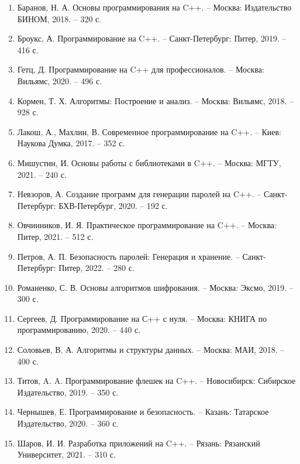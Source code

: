 \documentclass[14pt,a4paper]{scrartcl}
\begin{document}
\begin{enumerate}
\item Баранов, Н. А. Основы программирования на C++. – Москва: Издательство БИНОМ, 2018. – 320 с.
\item Броукс, А. Программирование на C++. – Санкт-Петербург: Питер, 2019. – 416 с.
\item Гетц, Д. Программирование на C++ для профессионалов. – Москва: Вильямс, 2020. – 496 с.
\item Кормен, Т. Х. Алгоритмы: Построение и анализ. – Москва: Вильямс, 2018. – 928 с.
\item Лакош, А., Махлин, В. Современное программирование на C++. – Киев: Наукова Думка, 2017. – 352 с.
\item Мишустин, И. Основы работы с библиотеками в C++. – Москва: МГТУ, 2021. – 240 с.
\item Невзоров, А. Создание программ для генерации паролей на C++. – Санкт-Петербург: БХВ-Петербург, 2020. – 192 с.
\item Овчинников, И. Я. Практическое программирование на C++. – Москва: Питер, 2021. – 512 с.
\item Петров, А. П. Безопасность паролей: Генерация и хранение. – Санкт-Петербург: Питер, 2022. – 280 с.
\item Романенко, С. В. Основы алгоритмов шифрования. – Москва: Эксмо, 2019. – 300 с.
\item Сергеев, Д. Программирование на С++ с нуля. – Москва: КНИГА по программированию, 2020. – 440 с.
\item Соловьев, В. А. Алгоритмы и структуры данных. – Москва: МАИ, 2018. – 400 с.
\item Титов, A. A. Программирование флешек  на C++. – Новосибирск: Сибирское Издательство, 2019. – 350 с.
\item Чернышев, Е. Программирование и безопасность. – Казань: Татарское Издательство, 2020. – 360 с.
\item Шаров, И. И. Разработка приложений на C++. – Рязань: Рязанский Университет, 2021. – 310 с.
\end{enumerate}
\end{document}
